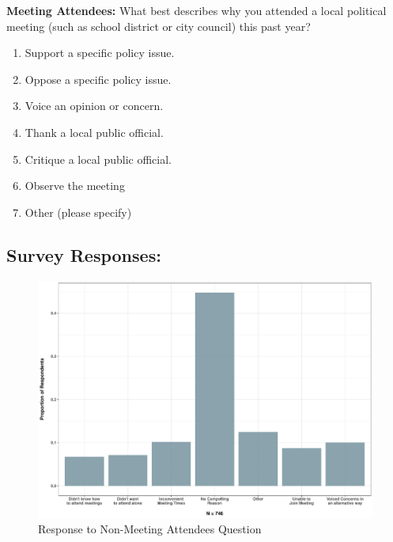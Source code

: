       \noindent \textbf{Meeting Attendees:} What best describes why you attended a local political meeting (such as school district or city council) this past year?
      \begin{enumerate}
        \item Support a specific policy issue.
        \item Oppose a specific policy issue.
        \item Voice an opinion or concern.
        \item Thank a local public official.
        \item Critique a local public official.
        \item Observe the meeting
        \item Other (please specify)
      \end{enumerate}


    \subsection{Survey Responses:}

    \begin{figure}[H]
      \centering
       \text{}\par\medskip
      \includegraphics[scale=0.43]{Figures/CCESNoMeeting.pdf}
      \caption[Response to Non-Meeting Attendees Question]{\footnotesize{Response to Non-Meeting Attendees Question}}
      \label{}
    \end{figure}



